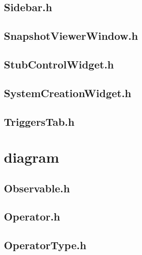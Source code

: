 \subsection{Sidebar.h}


\subsection{SnapshotViewerWindow.h}


\subsection{StubControlWidget.h}


\subsection{SystemCreationWidget.h}


\subsection{TriggersTab.h}


\section{diagram}

\subsection{Observable.h}


\subsection{Operator.h}


\subsection{OperatorType.h}


